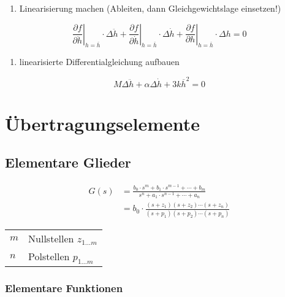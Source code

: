 \documentclass[
  10pt,
  a4paper,
  twocolumn]{article}
\makeatletter
\providecommand{\tightlist}{%
  \setlength{\itemsep}{0pt}\setlength{\parskip}{0pt}}\usepackage{longtable,booktabs,array}
\numberwithin{equation}{section}
\newenvironment{conditions}
  {\par\vspace{\abovedisplayskip}\noindent\begin{tabular}{>{$}l<{$} @{${}:{}$} l}}
  {\end{tabular}\par\vspace{\belowdisplayskip}}
\makeatother
\begin{document}
\begin{tcolorbox}
\small

\begin{enumerate}
\def\labelenumi{\arabic{enumi}.}
\setcounter{enumi}{3}
\tightlist
\item
  Linearisierung machen (Ableiten, dann Gleichgewichtslage einsetzen!)
\end{enumerate}

\normalsize

\[
\left.\frac{\partial f}{\partial \ddot{h}}\right\rvert_{h=\overline{h}} \cdot \Delta\ddot{h} + \left.\frac{\partial f}{\partial \dot{h}}\right\rvert_{h=\overline{h}} \cdot \Delta\dot{h} + \left.\frac{\partial f}{\partial h}\right\rvert_{h=\overline{h}} \cdot \Delta{h} = 0
\]

\small

\begin{enumerate}
\def\labelenumi{\arabic{enumi}.}
\setcounter{enumi}{4}
\tightlist
\item
  linearisierte Differentialgleichung aufbauen
\end{enumerate}

\normalsize

\[
M\Delta \ddot{h} + \alpha \Delta \dot{h} + 3 k\overline{h}^2=0
\]

\end{tcolorbox}

\section{Übertragungselemente}\label{uxfcbertragungselemente}

\subsection{Elementare Glieder}\label{elementare-glieder}

\[
\begin{split}
G(s) &= \frac{b_0\cdot s^m+b_1\cdot s^{m-1}+\cdots+b_m}{s^n+a_1\cdot s^{n-1}+\cdots+a_n} \\
 &= b_0\cdot\frac{(s+z_1)(s+z_2)\cdots(s+z_n)}{(s+p_1)(s+p_2)\cdots(s+p_n)}
\end{split}
\]

\begin{conditions}
  m & Nullstellen $z_{1\dots m}$ \\
  n & Polstellen $p_{1\dots m}$ \\
\end{conditions}

\subsubsection{Elementare Funktionen}\label{elementare-funktionen}
\end{document}
